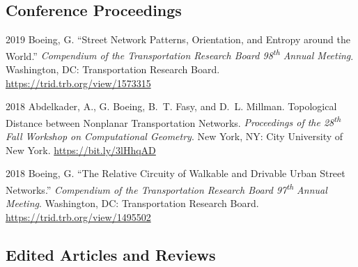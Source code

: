 \documentclass[12pt,letterpaper]{report}
\begin{document}
    \subsection*{Conference Proceedings}

    \begin{tablist}

        \item[2019] \tab Boeing, G. \enquote{Street Network Patterns, Orientation, and Entropy around the World.} \textit{Compendium of the Transportation Research Board 98\textsuperscript{th} Annual Meeting}. Washington, DC: Transportation Research Board. \href{https://trid.trb.org/view/1573315}{https://trid.trb.org/view/1573315}

        \item[2018] \tab Abdelkader, A., G. Boeing, B.~T. Fasy, and D.~L. Millman. Topological Distance between Nonplanar Transportation Networks. \textit{Proceedings of the 28\textsuperscript{th} Fall Workshop on Computational Geometry}. New York, NY: City University of New York. \href{https://bit.ly/3lHhqAD}{https://bit.ly/3lHhqAD}

        \item[2018] \tab Boeing, G. \enquote{The Relative Circuity of Walkable and Drivable Urban Street Networks.} \textit{Compendium of the Transportation Research Board 97\textsuperscript{th} Annual Meeting}. Washington, DC: Transportation Research Board. \href{https://trid.trb.org/view/1495502}{https://trid.trb.org/view/1495502}

    \end{tablist}



    \subsection*{Edited Articles and Reviews}
\end{document}
